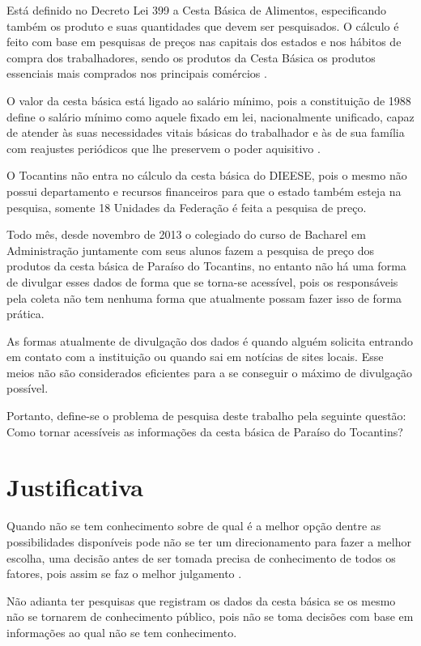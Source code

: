 \documentclass{ifto-tex}
\begin{document}
		Está definido no Decreto Lei 399 a Cesta Básica de Alimentos, especificando também os produto e suas quantidades que devem ser pesquisados. O cálculo é feito com base em pesquisas de preços nas capitais dos estados e nos hábitos de compra dos trabalhadores, sendo os produtos da Cesta Básica os produtos essenciais mais comprados nos principais comércios \cite{metodolo8:online}.
		
		O valor da cesta básica está ligado ao salário mínimo, pois a constituição de 1988 define o salário mínimo como aquele fixado em lei, nacionalmente unificado, capaz de atender às suas necessidades vitais básicas do trabalhador e às de sua família com reajustes periódicos que lhe preservem o poder aquisitivo \cite{metodolo8:online}.
		
		O Tocantins não entra no cálculo da cesta básica do DIEESE, pois o mesmo não possui departamento e recursos financeiros para que o estado também esteja na pesquisa, somente 18 Unidades da Federação é feita a pesquisa de preço.
		
		Todo mês, desde novembro de 2013 o colegiado do curso de Bacharel em Administração juntamente com seus alunos fazem a pesquisa de preço dos produtos da cesta básica de Paraíso do Tocantins, no entanto não há uma forma de divulgar esses dados de forma que se torna-se acessível, pois os responsáveis pela coleta não tem nenhuma forma que atualmente possam fazer isso de forma prática.
		
		As formas atualmente de divulgação dos dados é quando alguém solicita entrando em contato com a instituição ou quando sai em notícias de sites locais. Esse meios não são considerados eficientes para a se conseguir o máximo de divulgação possível.
		
		Portanto, define-se o problema de pesquisa deste trabalho pela seguinte questão: Como tornar acessíveis as informações da cesta básica de Paraíso do Tocantins?
		
	
\chapter{Justificativa}
	
		Quando não se tem conhecimento sobre de qual é a melhor opção dentre as possibilidades disponíveis pode não se ter um direcionamento para fazer a melhor escolha, uma decisão antes de ser tomada precisa de conhecimento de todos os fatores, pois assim se faz o melhor julgamento \cite{bezerra2013efeito}.
		
		Não adianta ter pesquisas que registram os dados da cesta básica se os mesmo não se tornarem de conhecimento público, pois não se toma decisões com base em informações ao qual não se tem conhecimento.
		
\end{document}
